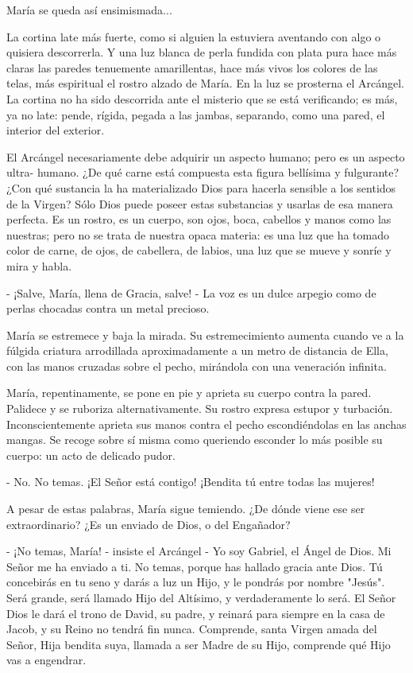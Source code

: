 \documentclass[12pt]{book} %
\begin{document}
María se queda así ensimismada... 

La cortina late más fuerte, como si alguien la estuviera aventando con algo o quisiera descorrerla. Y una luz blanca de perla fundida con plata pura hace más claras las paredes tenuemente amarillentas, hace más vivos los colores de las telas, más espiritual el rostro alzado de María. En la luz se prosterna el Arcángel. La cortina no ha sido descorrida ante el misterio que se está verificando; es más, ya no late: pende, rígida, pegada a las jambas, separando, como una pared, el interior del exterior. 

El Arcángel necesariamente debe adquirir un aspecto humano; pero es un aspecto ultra- humano. ¿De qué carne está compuesta esta figura bellísima y fulgurante? ¿Con qué sustancia la ha materializado Dios para hacerla sensible a los sentidos de la Virgen? Sólo Dios puede poseer estas substancias y usarlas de esa manera perfecta. Es un rostro, es un cuerpo, son ojos, boca, cabellos y manos como las nuestras; pero no se trata de nuestra opaca materia: es una luz que ha tomado color de carne, de ojos, de cabellera, de labios, una luz que se mueve y sonríe y mira y habla. 

- ¡Salve, María, llena de Gracia, salve! - La voz es un dulce arpegio como de perlas chocadas contra un metal precioso. 

María se estremece y baja la mirada. Su estremecimiento aumenta cuando ve a la fúlgida criatura arrodillada aproximadamente a un metro de distancia de Ella, con las manos cruzadas sobre el pecho, mirándola con una veneración infinita. 

María, repentinamente, se pone en pie y aprieta su cuerpo contra la pared. Palidece y se ruboriza alternativamente. Su rostro expresa estupor y turbación. Inconscientemente aprieta sus manos contra el pecho escondiéndolas en las anchas mangas. Se recoge sobre sí misma como queriendo esconder lo más posible su cuerpo: un acto de delicado pudor. 

- No. No temas. ¡El Señor está contigo! ¡Bendita tú entre todas las mujeres! 

A pesar de estas palabras, María sigue temiendo. ¿De dónde viene ese ser extraordinario? ¿Es un enviado de Dios, o del Engañador? 

- ¡No temas, María! - insiste el Arcángel - Yo soy Gabriel, el Ángel de Dios. Mi Señor me ha enviado a ti. No temas, porque has hallado gracia ante Dios. Tú concebirás en tu seno y darás a luz un Hijo, y le pondrás por nombre "Jesús". Será grande, será llamado Hijo del Altísimo, y verdaderamente lo será. El Señor Dios le dará el trono de David, su padre, y reinará para siempre en la casa de Jacob, y su Reino no tendrá fin nunca. Comprende, santa Virgen amada del Señor, Hija bendita suya, llamada a ser Madre de su Hijo, comprende qué Hijo vas a engendrar. 
\end{document}
